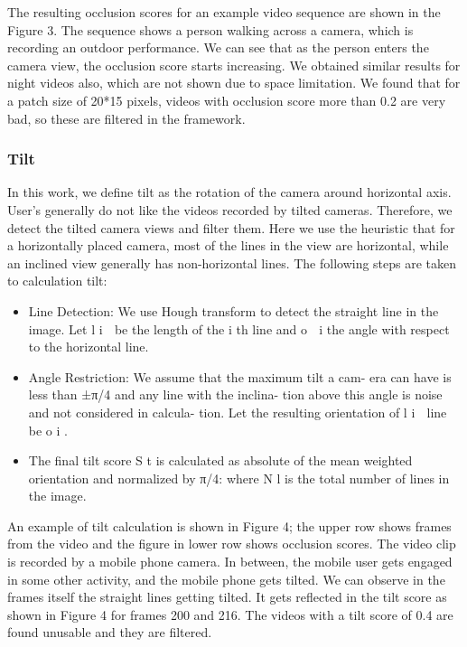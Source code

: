 \documentclass{sig-alternate}
\begin{document}
The resulting occlusion scores for an example video sequence
are shown in the Figure 3. The sequence shows a person walking
across a camera, which is recording an outdoor performance. We
can see that as the person enters the camera view, the occlusion
score starts increasing. We obtained similar results for night videos
also, which are not shown due to space limitation. We found that
for a patch size of 20*15 pixels, videos with occlusion score more
than 0.2 are very bad, so these are filtered in the framework.

\subsubsection{Tilt}
In this work, we define tilt as the rotation of the camera around
horizontal axis. User’s generally do not like the videos recorded
by tilted cameras. Therefore, we detect the tilted camera views
and filter them. Here we use the heuristic that for a horizontally
placed camera, most of the lines in the view are horizontal, while
an inclined view generally has non-horizontal lines. The following
steps are taken to calculation tilt:

\begin{itemize}
    \item Line Detection: We use Hough transform to detect the straight
line in the image. Let l i  be the length of the i th line and o  i
the angle with respect to the horizontal line.
    \item Angle Restriction: We assume that the maximum tilt a cam-
era can have is less than ±π/4 and any line with the inclina-
tion above this angle is noise and not considered in calcula-
tion. Let the resulting orientation of l i  line be o i .
    \item The final tilt score S t is calculated as absolute of the mean
weighted orientation and normalized by π/4:
where N l is the total number of lines in the image.
\end{itemize}


An example of tilt calculation is shown in Figure 4; the upper
row shows frames from the video and the figure in lower row shows
occlusion scores. The video clip is recorded by a mobile phone
camera. In between, the mobile user gets engaged in some other
activity, and the mobile phone gets tilted. We can observe in the
frames itself the straight lines getting tilted. It gets reflected in the
tilt score as shown in Figure 4 for frames 200 and 216. The videos
with a tilt score of 0.4 are found unusable and they are filtered.
\end{document}
